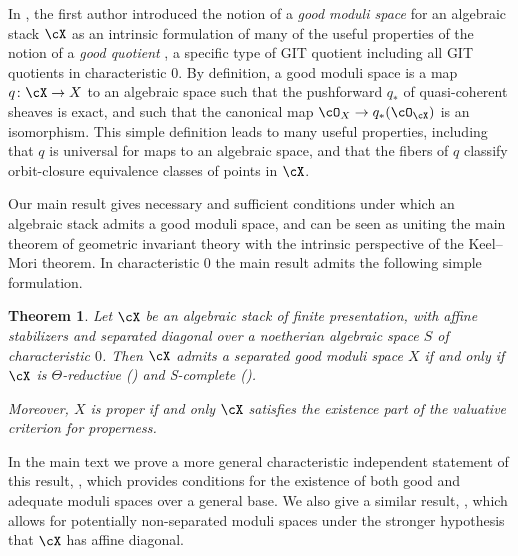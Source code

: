 \documentclass[a4paper]{amsart}
\numberwithin{equation}{section}
\theoremstyle{plain}
\newtheorem{thmx}{Theorem}
\theoremstyle{definition}
\newcommand{\co}{\colon}
\begin{document}
In \cite{alper-good}, the first author introduced the notion of a \emph{good moduli space} for an algebraic stack $\cX$ as an intrinsic formulation of many of the useful properties of the notion of a \emph{good quotient} \cite{seshadri_quotient}, a specific type of GIT quotient including all GIT quotients in characteristic $0$.  
By definition, a good moduli space is a map $q \co \cX \to X$ to an algebraic space such that the pushforward $q_\ast$ of quasi-coherent sheaves is exact, and such that the canonical map $\cO_X \to q_\ast(\cO_\cX)$ is an isomorphism. This simple definition leads to many useful properties, including that $q$ is universal for maps to an algebraic space, and that the fibers of $q$ classify orbit-closure equivalence classes of points in $\cX$. 

Our main result gives necessary and sufficient conditions under which an algebraic stack admits a good moduli space, and can be seen as uniting the main theorem of geometric invariant theory with the intrinsic perspective of the Keel--Mori theorem. In characteristic $0$ the main result admits the following simple formulation.
\begin{thmx} \label{T:existence} \label{T:A}
Let $\cX$ be an algebraic stack of finite presentation, with affine {stabilizers} and separated diagonal over a noetherian algebraic space $S$ of characteristic $0$. Then $\cX$ admits a separated good moduli space $X$ if and only if $\cX$ is $\Theta$-reductive () and  {\textsf{S}}-complete  ().

Moreover, $X$ is proper if and only $\cX$ satisfies the existence part of the valuative criterion for properness.
\end{thmx}

{In the main text we prove a more general characteristic independent statement of this result, , which provides conditions for the existence of both good and adequate moduli spaces over a general base. We also give a similar result, , which allows for potentially non-separated moduli spaces under the stronger hypothesis that $\cX$ has affine diagonal.}
\end{document}
